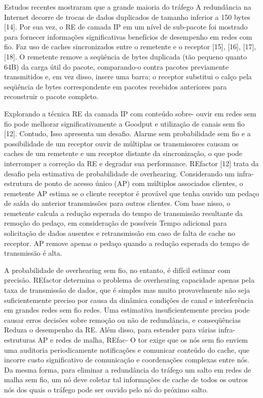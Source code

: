 \documentclass[12pt]{article}
\begin{document}
Estudos recentes mostraram que a grande maioria do tráfego
A redundância na Internet decorre de trocas de dados duplicados de
tamanho inferior a 150 bytes [14]. Por sua vez, o RE de camada IP em um nível de sub-pacote foi mostrado para fornecer informações significativas
benefícios de desempenho em redes com fio. Faz uso de
caches sincronizados entre o remetente e o receptor [15],
[16], [17], [18]. O remetente remove a seqüência de bytes duplicada
(tão pequeno quanto 64B) da carga útil do pacote, comparando-o
contra pacotes previamente transmitidos e, em vez disso, insere uma barra;
o receptor substitui o calço pela seqüência de bytes correspondente
em pacotes recebidos anteriores para reconstruir o pacote completo.

Explorando a técnica RE da camada IP com conteúdo sobre-
ouvir em redes sem fio pode melhorar significativamente a
Goodput e utilização de canais sem fio [12]. Contudo,
Isso apresenta um desafio. Alarme sem probabilidade sem fio
e a possibilidade de um receptor ouvir de múltiplas
os transmissores causam os caches de um remetente e um receptor distante
da sincronização, o que pode interromper a correção da RE
e degradar sua performance. REfactor [12] trata da
desafio pela estimativa de probabilidade de overhearing. Considerando um
infra-estrutura de ponto de acesso único (AP) com múltiplos associados
clientes, o remetente AP estima se o cliente receptor
é provável que tenha ouvido um pedaço de saída do anterior
transmissões para outros clientes. Com base nisso, o remetente
calcula a redução esperada do tempo de transmissão resultante
da remoção do pedaço, em consideração de possíveis
Tempo adicional para solicitação de dados ausentes e retransmissão em
caso de falta de cache no receptor. AP remove apenas o pedaço
quando a redução esperada do tempo de transmissão é alta.

A probabilidade de overhearing sem fio, no entanto, é difícil
estimar com precisão. REfactor determina o problema de overhearing
capacidade apenas pela taxa de transmissão de dados, que é simples
mas muito provavelmente não seja suficientemente preciso por causa da dinâmica
condições de canal e interferência em grandes redes sem fio
redes. Uma estimativa insuficientemente precisa pode causar erros
decisões sobre remoção ou não de redundância, e conseqüências
Reduza o desempenho da RE. Além disso, para estender
para várias infra-estruturas AP e redes de malha, REfac-
O tor exige que os nós sem fio enviem uma auditoria periodicamente
notificações e comunicar conteúdo do cache, que incorre
custo significativo de comunicação e coordenações complexas
entre nós. Da mesma forma, para eliminar a redundância do tráfego
um salto em redes de malha sem fio, um nó deve coletar tal
informações de cache de todos os outros nós dos quais o tráfego
pode ser ouvido pelo nó do próximo salto.
\end{document}

